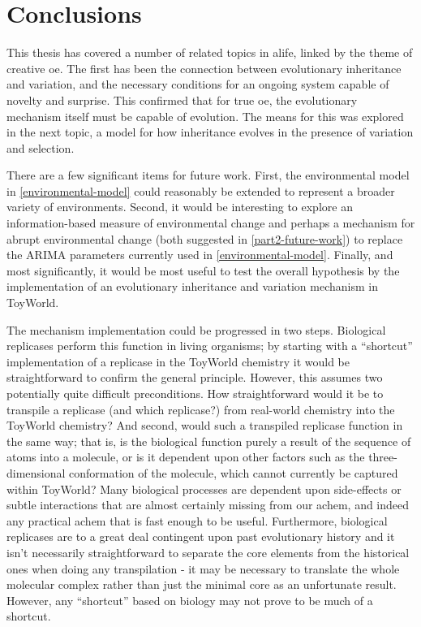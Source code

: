\chapter{Conclusions}\label{thesis-conclusions}

This thesis has covered a number of related topics in \gls{alife}, linked by the theme of creative \gls{oe}. The first has been the connection between evolutionary inheritance and variation, and the necessary conditions for an ongoing system capable of novelty and surprise. This confirmed that for true \gls{oe}, the evolutionary mechanism itself must be capable of evolution. The means for this was explored in the next topic, a model for how inheritance evolves in the presence of variation and selection. 

There are a few significant items for future work. First, the environmental model in \cref{environmental-model} could reasonably be extended to represent a broader variety of environments. Second, it would be interesting to explore an information-based measure of environmental change and perhaps a mechanism for abrupt environmental change (both suggested in \cref{part2-future-work}) to replace the ARIMA parameters currently used in \cref{environmental-model}. Finally, and most significantly, it would be most useful to test the overall hypothesis by the implementation of an evolutionary inheritance and variation mechanism in ToyWorld.

The mechanism implementation could be progressed in two steps. Biological replicases perform this function in living organisms; by starting with a ``shortcut'' implementation of a replicase in the ToyWorld chemistry it would be straightforward to confirm the general principle. However, this assumes two potentially quite difficult preconditions. How straightforward would it be to transpile a replicase (and which replicase?) from real-world chemistry into the ToyWorld chemistry? And second, would such a transpiled replicase function in the same way; that is, is the biological function purely a result of the sequence of atoms into a molecule, or is it dependent upon other factors such as the three-dimensional conformation of the molecule, which cannot currently be captured within ToyWorld? Many biological processes are dependent upon side-effects or subtle interactions that are almost certainly missing from our \gls{achem}, and indeed any practical \gls{achem} that is fast enough to be useful. Furthermore, biological replicases are to a great deal contingent upon past evolutionary history and it isn't necessarily straightforward to separate the core elements from the historical ones when doing any transpilation - it may be necessary to translate the whole molecular complex rather than just the minimal core as an unfortunate result. However, any ``shortcut'' based on biology may not prove to be much of a shortcut. 


